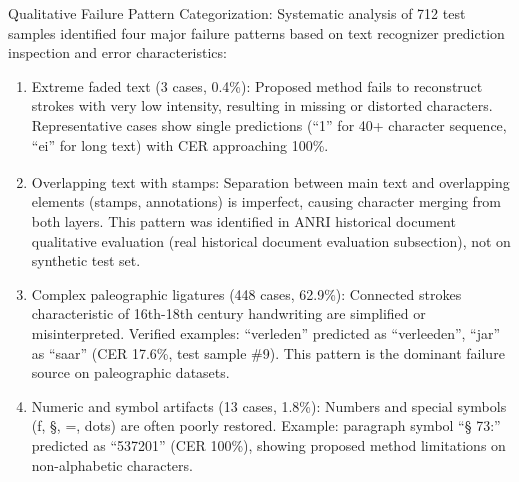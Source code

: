 \documentclass[journal]{IEEEtran}
\begin{document}
Qualitative Failure Pattern Categorization\protect\footnotemark:
Systematic analysis of 712 test samples identified four major failure patterns based on text recognizer prediction inspection and error characteristics:
\begin{enumerate}
    \item Extreme faded text (3 cases, 0.4\%): Proposed method fails to reconstruct strokes with very low intensity, resulting in missing or distorted characters. Representative cases show single predictions (``1'' for 40+ character sequence, ``ei'' for long text) with CER approaching 100\%.
    
    \item Overlapping text with stamps\textsuperscript{\textdagger}: Separation between main text and overlapping elements (stamps, annotations) is imperfect, causing character merging from both layers. This pattern was identified in ANRI historical document qualitative evaluation (real historical document evaluation subsection), not on synthetic test set.
    
    \item Complex paleographic ligatures (448 cases, 62.9\%): Connected strokes characteristic of 16th-18th century handwriting are simplified or misinterpreted. Verified examples: ``verleden'' predicted as ``verleeden'', ``jar'' as ``saar'' (CER 17.6\%, test sample \#9). This pattern is the dominant failure source on paleographic datasets.
    
    \item Numeric and symbol artifacts (13 cases, 1.8\%): Numbers and special symbols (ƒ, §, =, dots) are often poorly restored. Example: paragraph symbol ``§ 73:'' predicted as ``537201'' (CER 100\%), showing proposed method limitations on non-alphabetic characters.

\end{enumerate}
\end{document}
